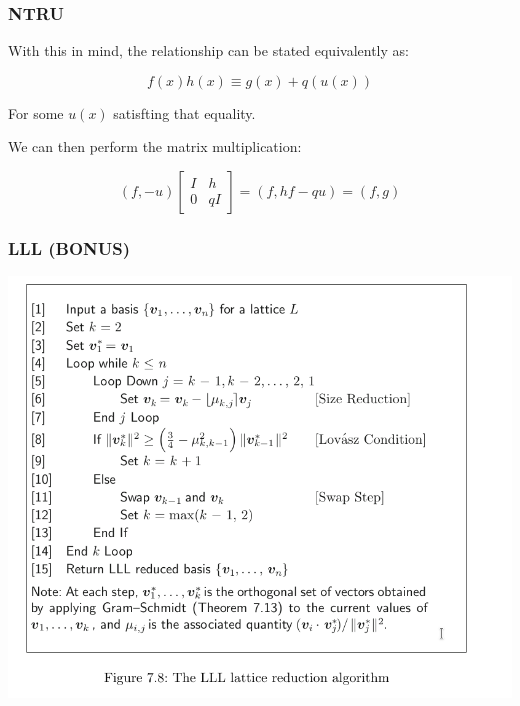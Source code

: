 \documentclass{beamer}
\begin{document}
\begin{frame}
\frametitle{NTRU}
With this in mind, the relationship can be stated equivalently as:

\[ f(x)h(x) \equiv g(x) + q(u(x)) \]

For some $u(x)$ satisfting that equality.

We can then perform the matrix multiplication:

\[ (f, -u) \begin{bmatrix}
I & h \\
0 & qI
\end{bmatrix} = (f, hf - qu) = (f, g)\]


\end{frame}

\begin{frame}
\frametitle{LLL (BONUS)}
\begin{center}
\includegraphics[scale=0.3	]{LLL-Reduction.png}
\end{center}


\end{frame}
	
\end{document}
